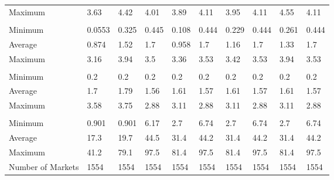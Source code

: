 \begin{tabular}[t]{llllllllll}
\hspace{1em}Maximum & 3.63 & 4.42 & 4.01 & 3.89 & 4.11 & 3.95 & 4.11 & 4.55 & 4.11\\
\addlinespace[0.3em]
\multicolumn{10}{l}{\textbf{Marginal Cost}}\\
\hspace{1em}Minimum & 0.0553 & 0.325 & 0.445 & 0.108 & 0.444 & 0.229 & 0.444 & 0.261 & 0.444\\
\hspace{1em}Average & 0.874 & 1.52 & 1.7 & 0.958 & 1.7 & 1.16 & 1.7 & 1.33 & 1.7\\
\hspace{1em}Maximum & 3.16 & 3.94 & 3.5 & 3.36 & 3.53 & 3.42 & 3.53 & 3.94 & 3.53\\
\addlinespace[0.3em]
\multicolumn{10}{l}{\textbf{Miles Flown}}\\
\hspace{1em}Minimum & 0.2 & 0.2 & 0.2 & 0.2 & 0.2 & 0.2 & 0.2 & 0.2 & 0.2\\
\hspace{1em}Average & 1.7 & 1.79 & 1.56 & 1.61 & 1.57 & 1.61 & 1.57 & 1.61 & 1.57\\
\hspace{1em}Maximum & 3.58 & 3.75 & 2.88 & 3.11 & 2.88 & 3.11 & 2.88 & 3.11 & 2.88\\
\addlinespace[0.3em]
\multicolumn{10}{l}{\textbf{Origin Service Ratio}}\\
\hspace{1em}Minimum & 0.901 & 0.901 & 6.17 & 2.7 & 6.74 & 2.7 & 6.74 & 2.7 & 6.74\\
\hspace{1em}Average & 17.3 & 19.7 & 44.5 & 31.4 & 44.2 & 31.4 & 44.2 & 31.4 & 44.2\\
\hspace{1em}Maximum & 41.2 & 79.1 & 97.5 & 81.4 & 97.5 & 81.4 & 97.5 & 81.4 & 97.5\\
\midrule
Number of Markets & 1554 & 1554 & 1554 & 1554 & 1554 & 1554 & 1554 & 1554 & 1554\\
\bottomrule
\end{tabular}
